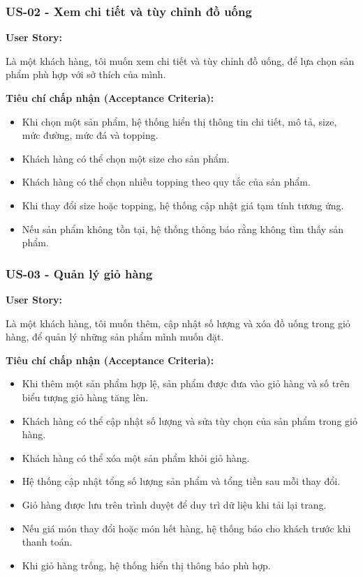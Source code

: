\documentclass[12pt,a4paper]{article}
\newcommand{\userstory}[2]{%
  \noindent\textbf{User Story:}\par
  #1\par
  \hspace*{\parindent}\textbf{Tiêu chí chấp nhận (Acceptance Criteria):}
  \begin{itemize}
    #2
  \end{itemize}}
\begin{document}
\subsubsection{US-02 - Xem chi tiết và tùy chỉnh đồ uống}
\userstory{Là một khách hàng, tôi muốn xem chi tiết và tùy chỉnh đồ uống, để lựa chọn sản phẩm phù hợp với sở thích của mình.}{
  \item Khi chọn một sản phẩm, hệ thống hiển thị thông tin chi tiết, mô tả, size, mức đường, mức đá và topping.
  \item Khách hàng có thể chọn một size cho sản phẩm.
  \item Khách hàng có thể chọn nhiều topping theo quy tắc của sản phẩm.
  \item Khi thay đổi size hoặc topping, hệ thống cập nhật giá tạm tính tương ứng.
  \item Nếu sản phẩm không tồn tại, hệ thống thông báo rằng không tìm thấy sản phẩm.
}

\subsubsection{US-03 - Quản lý giỏ hàng}
\userstory{Là một khách hàng, tôi muốn thêm, cập nhật số lượng và xóa đồ uống trong giỏ hàng, để quản lý những sản phẩm mình muốn đặt.}{
  \item Khi thêm một sản phẩm hợp lệ, sản phẩm được đưa vào giỏ hàng và số trên biểu tượng giỏ hàng tăng lên.
  \item Khách hàng có thể cập nhật số lượng và sửa tùy chọn của sản phẩm trong giỏ hàng.
  \item Khách hàng có thể xóa một sản phẩm khỏi giỏ hàng.
  \item Hệ thống cập nhật tổng số lượng sản phẩm và tổng tiền sau mỗi thay đổi.
  \item Giỏ hàng được lưu trên trình duyệt để duy trì dữ liệu khi tải lại trang.
  \item Nếu giá món thay đổi hoặc món hết hàng, hệ thống báo cho khách trước khi thanh toán.
  \item Khi giỏ hàng trống, hệ thống hiển thị thông báo phù hợp.
}
\end{document}
